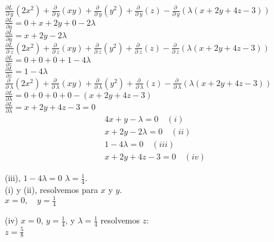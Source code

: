 \documentclass[13pt]{memoir}
\begin{document}
\begin{enumerate}
$\frac{\partial L\:}{\partial \:y}\left(2x^2\right)+\frac{\partial \:}{\partial \:y}\left(xy\right)+\frac{\partial \:}{\partial \:y}\left(y^2\right)+\frac{\partial \:}{\partial \:y}\left(z\right)-\frac{\partial \:}{\partial \:y}\left(\lambda\left(x+2y+4z-3\right)\right)$\\
$\frac{\partial L}{\partial y} = 0+x+2y+0-2\lambda$\\
$\frac{\partial L}{\partial y} = x + 2y - 2\lambda$\\

$\frac{\partial L\:}{\partial \:z}\left(2x^2\right)+\frac{\partial \:}{\partial \:z}\left(xy\right)+\frac{\partial \:}{\partial \:z}\left(y^2\right)+\frac{\partial \:}{\partial \:z}\left(z\right)-\frac{\partial \:}{\partial \:z}\left(\lambda\left(x+2y+4z-3\right)\right)$\\
$\frac{\partial L}{\partial z} = 0+0+0+1-4\lambda$\\
$\frac{\partial L}{\partial z} = 1 - 4\lambda$\\

$\frac{\partial \:}{\partial \:λ}\left(2x^2\right)+\frac{\partial \:}{\partial \:λ}\left(xy\right)+\frac{\partial \:}{\partial \:λ}\left(y^2\right)+\frac{\partial \:}{\partial \:λ}\left(z\right)-\frac{\partial \:}{\partial \:\lambda}\left(\lambda\left(x+2y+4z-3\right)\right)$\\
$\frac{\partial L}{\partial \lambda} = 0+0+0+0-\left(x+2y+4z-3\right)$\\
$\frac{\partial L}{\partial \lambda} = x + 2y + 4z - 3 = 0$\\


\begin{align*}
4x + y - \lambda = 0 \quad (i) \\
x + 2y - 2\lambda = 0 \quad (ii) \\
1 - 4\lambda = 0 \quad (iii) \\
x + 2y + 4z - 3 = 0 \quad (iv)
\end{align*}


(iii), \(1 - 4\lambda = 0\) \qquad \rightarrow  \qquad\(\lambda = \frac{1}{4}\).\\


(i) y (ii), resolvemos para \(x\) y \(y\).\\

$x = 0, \quad y = \frac{1}{4}$

(iv) \(x = 0\), \(y = \frac{1}{4}\), y \(\lambda = \frac{1}{4}\) resolvemos \(z\):\\

$z = \frac{5}{8}$\\


\end{enumerate}
\end{document}
